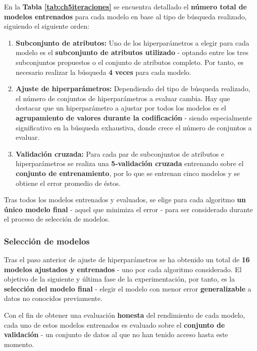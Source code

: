 En la \textbf{Tabla \ref{tab:ch5iteraciones}} se encuentra detallado el \textbf{número total de modelos entrenados} para cada modelo en base al tipo de búsqueda realizado, siguiendo el siguiente orden:
\begin{enumerate}[parsep=2pt, itemsep=2pt, topsep=4pt]
	\item \textbf{Subconjunto de atributos:} Uno de los hiperparámetros a elegir para cada modelo es el \textbf{subconjunto de atributos utilizado} - optando entre los tres subconjuntos propuestos o el conjunto de atributos completo. Por tanto, es necesario realizar la búsqueda \textbf{4 veces} para cada modelo.
	\item \textbf{Ajuste de hiperparámetros:} Dependiendo del tipo de búsqueda realizado, el número de conjuntos de hiperparámetros a evaluar cambia. Hay que destacar que un hiperparámetro a ajustar por todos los modelos es el \textbf{agrupamiento de valores durante la codificación} - siendo especialmente significativo en la búsqueda exhaustiva, donde crece el número de conjuntos a evaluar.
	\item \textbf{Validación cruzada:} Para cada par de subconjuntos de atributos e hiperparámetros se realiza una \textbf{5-validación cruzada} entrenando sobre el \textbf{conjunto de entrenamiento}, por lo que se entrenan cinco modelos y se obtiene el error promedio de éstos.
\end{enumerate}

Tras todos los modelos entrenados y evaluados, se elige para cada algoritmo \textbf{un único modelo final} - aquel que minimiza el error - para ser considerado durante el proceso de selección de modelos.

\subsubsection{Selección de modelos}

Tras el paso anterior de ajuste de hiperparámetros se ha obtenido un total de \textbf{16 modelos ajustados y entrenados} - uno por cada algoritmo considerado. El objetivo de la siguiente y última fase de la experimentación, por tanto, es la \textbf{selección del modelo final} - elegir el modelo con menor error \textbf{generalizable} a datos no conocidos previamente.

Con el fin de obtener una evaluación \textbf{honesta} del rendimiento de cada modelo, cada uno de estos modelos entrenados es evaluado sobre el \textbf{conjunto de validación} - un conjunto de datos al que no han tenido acceso hasta este momento.

